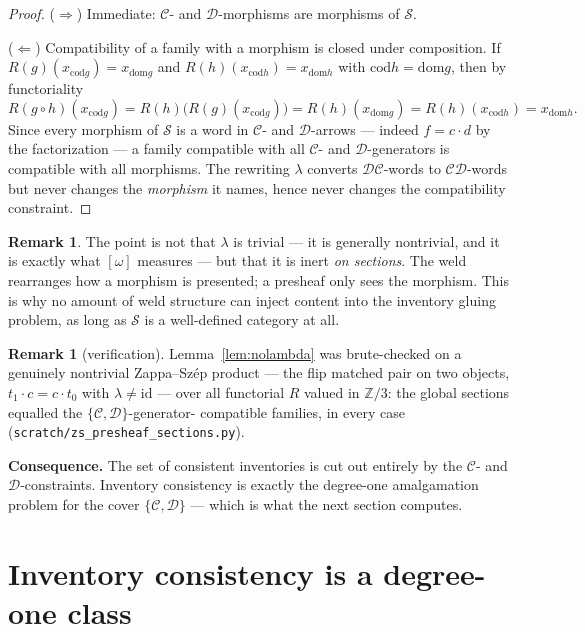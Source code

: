 \documentclass[11pt]{article}
\theoremstyle{definition}
\newtheorem{remark}[theorem]{Remark}
\newcommand{\Sc}{\mathcal{S}}
\newcommand{\C}{\mathcal{C}}
\newcommand{\D}{\mathcal{D}}
\newcommand{\dom}{\mathrm{dom}}
\newcommand{\cod}{\mathrm{cod}}
\newcommand{\id}{\mathrm{id}}
\newcommand{\Z}{\mathbb{Z}}
\begin{document}
\begin{proof}
($\Rightarrow$) Immediate: $\C$- and $\D$-morphisms are morphisms of $\Sc$.

($\Leftarrow$) Compatibility of a family with a morphism is closed under composition. If
$R(g)(x_{\cod g})=x_{\dom g}$ and $R(h)(x_{\cod h})=x_{\dom h}$ with $\cod h=\dom g$, then by
functoriality
\[
  R(g\circ h)(x_{\cod g})=R(h)\bigl(R(g)(x_{\cod g})\bigr)
  =R(h)(x_{\dom g})=R(h)(x_{\cod h})=x_{\dom h}.
\]
Since every morphism of $\Sc$ is a word in $\C$- and $\D$-arrows --- indeed $f=c\cdot d$ by the
factorization --- a family compatible with all $\C$- and $\D$-generators is compatible with all
morphisms. The rewriting $\lambda$ converts $\D\C$-words to $\C\D$-words but never changes the
\emph{morphism} it names, hence never changes the compatibility constraint.
\end{proof}

\begin{remark}
The point is not that $\lambda$ is trivial --- it is generally nontrivial, and it is exactly
what $[\omega]$ measures --- but that it is inert \emph{on sections}. The weld rearranges how a
morphism is presented; a presheaf only sees the morphism. This is why no amount of weld
structure can inject content into the inventory gluing problem, as long as $\Sc$ is a
well-defined category at all.
\end{remark}

\begin{remark}[verification]
Lemma~\ref{lem:nolambda} was brute-checked on a genuinely nontrivial Zappa--Sz\'ep product ---
the flip matched pair on two objects, $t_1\cdot c=c\cdot t_0$ with $\lambda\neq\id$ --- over all
functorial $R$ valued in $\Z/3$: the global sections equalled the $\{\C,\D\}$-generator-%
compatible families, in every case (\texttt{scratch/zs\_presheaf\_sections.py}).
\end{remark}

\noindent\textbf{Consequence.} The set of consistent inventories is cut out entirely by the
$\C$- and $\D$-constraints. Inventory consistency is exactly the degree-one amalgamation problem
for the cover $\{\C,\D\}$ --- which is what the next section computes.

\section{Inventory consistency is a degree-one class}\label{sec:degree1}
\end{document}
